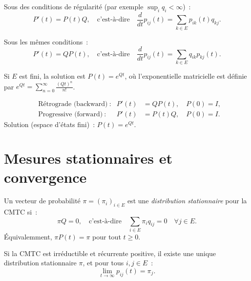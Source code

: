 \begin{theoreme}
\label{thm:kolmo_forward}
Sous des conditions de r\'egularit\'e (par exemple $\sup_i q_i < \infty$)~:
\[
  P'(t) = P(t) Q, \quad \text{c'est-\`a-dire} \quad
  \frac{d}{dt} p_{ij}(t) = \sum_{k \in E} p_{ik}(t) q_{kj}.
\]
\end{theoreme}

\begin{theoreme}
\label{thm:kolmo_backward}
Sous les m\^emes conditions~:
\[
  P'(t) = Q P(t), \quad \text{c'est-\`a-dire} \quad
  \frac{d}{dt} p_{ij}(t) = \sum_{k \in E} q_{ik} p_{kj}(t).
\]
\end{theoreme}

\begin{remarque}
Si $E$ est fini, la solution est $P(t) = e^{Qt}$, o\`u l'exponentielle matricielle
est d\'efinie par $e^{Qt} = \sum_{n=0}^{\infty} \frac{(Qt)^n}{n!}$.
\end{remarque}

\begin{formules}[title=\textbf{\'Equations de Kolmogorov}]
\begin{align*}
  &\text{R\'etrograde (backward)}~: & P'(t) &= QP(t), \quad P(0) = I, \\
  &\text{Progressive (forward)}~: & P'(t) &= P(t)Q, \quad P(0) = I.
\end{align*}
Solution (espace d'\'etats fini)~: $P(t) = e^{Qt}$.
\end{formules}

\section{Mesures stationnaires et convergence}

\begin{definition}
Un vecteur de probabilit\'e $\pi = (\pi_i)_{i \in E}$ est une \emph{distribution
stationnaire} pour la CMTC si~:
\[
  \pi Q = 0, \quad \text{c'est-\`a-dire} \quad \sum_{i \in E} \pi_i q_{ij} = 0
  \quad \forall j \in E.
\]
\'Equivalemment, $\pi P(t) = \pi$ pour tout $t \geq 0$.
\end{definition}

\begin{theoreme}
\label{thm:convergence_equilibre}
Si la CMTC est irr\'eductible et r\'ecurrente positive, il existe une unique
distribution stationnaire $\pi$, et pour tous $i, j \in E$~:
\[
  \lim_{t \to \infty} p_{ij}(t) = \pi_j.
\]
\end{theoreme}

